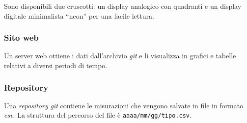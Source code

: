 \documentclass[12pt, a4paper]{article}
\begin{document}
	Sono disponibili due cruscotti: un display analogico con quadranti e un display digitale minimalista ``neon'' per una facile lettura.
	\subsubsection{Sito web}
	
	Un server web ottiene i dati dall'archivio \emph{git} e li visualizza in grafici e tabelle relativi a diversi periodi di tempo.
	
	\subsubsection{Repository}
	
	Una \emph{repository} \emph{git} contiene le misurazioni che vengono salvate in file in formato \emph{csv}.
	La struttura del percorso del file è \texttt{aaaa/mm/gg/tipo.csv}.
	
\end{document}
